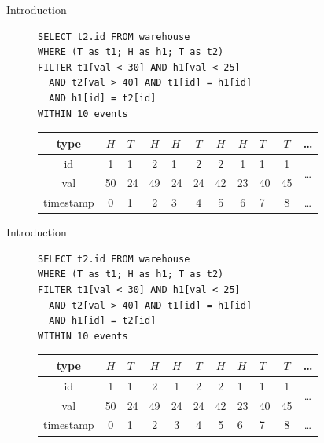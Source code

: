 \documentclass[xcolor=pdftex,dvipsnames,table]{beamer}
\begin{document}
\begin{frame}[fragile]{Introduction}
 \begin{example}{}
    \begin{figure}[H]
      \begin{verbatim}
SELECT t2.id FROM warehouse
WHERE (T as t1; H as h1; T as t2)
FILTER t1[val < 30] AND h1[val < 25]
  AND t2[val > 40] AND t1[id] = h1[id]
  AND h1[id] = t2[id]
WITHIN 10 events
      \end{verbatim}
    \end{figure}
    \begin{figure}[H]
      \centering
      \begin{tabular}{|c|c|a|c|a|c|c|c|a|c|c}\hline
        type  &$H$&$T$&$H$&$H$&$T$&$H$&$H$&$T$&$T$ & \ldots \\ \hline
        id  & 1 & 1 & 2 & 1 & 2 & 2 & 1 & 1 & 1 &  \\
        val & 50 & 24& 49& 24& 24& 42& 23& 40& 45\\ \hline
        timestamp & 0 & 1 & 2 & 3 & 4 & 5 & 6 & 7 & 8 & \ldots \\ \hline
      \end{tabular}
    \end{figure}
 \end{example}
\end{frame}

\begin{frame}[fragile]{Introduction}
 \begin{example}{}
    \begin{figure}[H]
      \begin{verbatim}
SELECT t2.id FROM warehouse
WHERE (T as t1; H as h1; T as t2)
FILTER t1[val < 30] AND h1[val < 25]
  AND t2[val > 40] AND t1[id] = h1[id]
  AND h1[id] = t2[id]
WITHIN 10 events
      \end{verbatim}
    \end{figure}
    \begin{figure}[H]
      \centering
      \begin{tabular}{|c|c|a|c|c|c|c|a|a|c|c}\hline
        type  &$H$&$T$&$H$&$H$&$T$&$H$&$H$&$T$&$T$ & \ldots \\ \hline
        id  & 1 & 1 & 2 & 1 & 2 & 2 & 1 & 1 & 1 &  \\
        val & 50 & 24& 49& 24& 24& 42& 23& 40& 45\\ \hline
        timestamp & 0 & 1 & 2 & 3 & 4 & 5 & 6 & 7 & 8 & \ldots \\ \hline
      \end{tabular}
    \end{figure}
 \end{example}
\end{frame}
\end{document}
